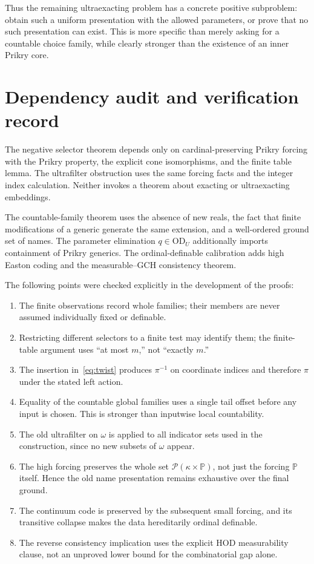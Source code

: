 \documentclass[11pt,letterpaper]{article}
\theoremstyle{definition}
\numberwithin{equation}{section}
\newcommand{\OD}{\mathrm{OD}}
\newcommand{\Pow}{\mathcal P}
\newcommand{\PP}{\mathbb P}
\begin{document}
Thus the remaining ultraexacting problem has a concrete positive subproblem: obtain such a uniform presentation with the allowed parameters, or prove that no such presentation can exist. This is more specific than merely asking for a countable choice family, while clearly stronger than the existence of an inner Prikry core.

\appendix
\section{Dependency audit and verification record}\label{app:audit}

The negative selector theorem depends only on cardinal-preserving Prikry forcing with the Prikry property, the explicit cone isomorphisms, and the finite table lemma. The ultrafilter obstruction uses the same forcing facts and the integer index calculation. Neither invokes a theorem about exacting or ultraexacting embeddings.

The countable-family theorem uses the absence of new reals, the fact that finite modifications of a generic generate the same extension, and a well-ordered ground set of names. The parameter elimination $q\in\OD_U$ additionally imports containment of Prikry generics. The ordinal-definable calibration adds high Easton coding and the measurable--GCH consistency theorem.

The following points were checked explicitly in the development of the proofs:
\begin{enumerate}
\item The finite observations record whole families; their members are never assumed individually fixed or definable.
\item Restricting different selectors to a finite test may identify them; the finite-table argument uses ``at most $m$,'' not ``exactly $m$.''
\item The insertion in~\eqref{eq:twist} produces $\pi^{-1}$ on coordinate indices and therefore $\pi$ under the stated left action.
\item Equality of the countable global families uses a single tail offset before any input is chosen. This is stronger than inputwise local countability.
\item The old ultrafilter on $\omega$ is applied to all indicator sets used in the construction, since no new subsets of $\omega$ appear.
\item The high forcing preserves the whole set $\Pow(\kappa\times\PP)$, not just the forcing $\PP$ itself. Hence the old name presentation remains exhaustive over the final ground.
\item The continuum code is preserved by the subsequent small forcing, and its transitive collapse makes the data hereditarily ordinal definable.
\item The reverse consistency implication uses the explicit HOD measurability clause, not an unproved lower bound for the combinatorial gap alone.
\end{enumerate}
\end{document}
